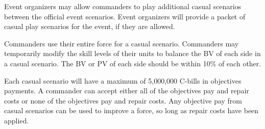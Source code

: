 Event organizers may allow commanders to play additional casual scenarios between the official event scenarios.
Event organizers will provide a packet of casual play scenarios for the event, if they are allowed.

Commanders use their entire force for a casual scenario.
Commanders may temporarily modify the skill levels of their units to balance the BV of each side in a casual scenario.
The BV or PV of each side should be within 10\% of each other.

Each casual scenario will have a maximum of 5,000,000 C-bills in objectives payments.
A commander can accept either all of the objectives pay and repair costs or none of the objectives pay and repair costs.
Any objective pay from casual scenarios can be used to improve a force, so long as repair costs have been applied.
